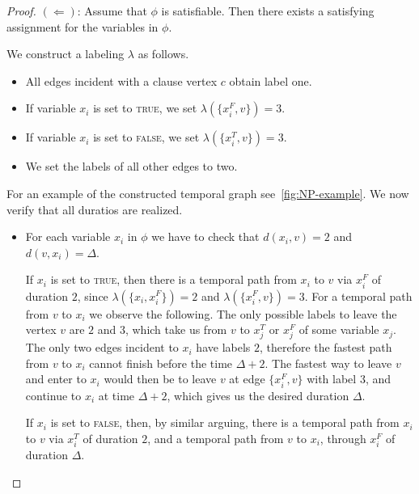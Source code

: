 \documentclass[a4paper,UKenglish,cleveref, autoref, thm-restate]{lipics-v2021}
\begin{document}
\begin{proof}

$(\Leftarrow)$: Assume that $\phi$ is satisfiable. Then there exists a satisfying assignment for the variables in $\phi$.

We construct a labeling $\lambda$ as follows.
\begin{itemize}
    \item All edges incident with a clause vertex $c$ obtain label one.
    \item If variable $x_i$ is set to \textsc{true}, we set $\lambda(\{x_i^F, v\})=3$.
    \item If variable $x_i$ is set to \textsc{false}, we set $\lambda(\{x_i^T, v\})=3$.
    \item We set the labels of all other edges to two.
\end{itemize}
For an example of the constructed temporal graph see~\cref{fig:NP-example}.
We now verify that all duratios are realized.
\begin{itemize}
    \item For each variable $x_i$ in $\phi$ we have to check that $d(x_i,v)=2$
    and $d(v,x_i)=\Delta$. 
    
    If $x_i$ is set to \textsc{true}, then there is a temporal path from $x_i$ to $v$ via 
    $x_i^F$ of duration $2$, since
    $\lambda(\{x_i, x_i^F\})=2$ and $\lambda(\{x_i^F, v\})=3$.
    For a temporal path from $v$ to $x_i$ we observe the following.
    The only possible labels to leave the vertex $v$ are $2$ and $3$, which take us from $v$ to $x_j^T$ or $x_j^F$ of some variable $x_j$.
    The only two edges incident to $x_i$ have labels $2$, therefore the fastest path from $v$ to $x_i$
    cannot finish before the time $\Delta + 2$.
    The fastest way to leave $v$ and enter to $x_i$ would then be to leave $v$ at edge $\{x_i^F,v\}$ with label $3$,
    and continue to $x_i$ at time $\Delta + 2$,
    which gives us the desired duration $\Delta$.
    
    If $x_i$ is set to \textsc{false}, then, by similar arguing, 
    there is a temporal path from $x_i$ to $v$ via $x_i^T$ of duration $2$,
    and a temporal path from $v$ to $x_i$, through $x_i^F$ of duration $\Delta$.


\end{itemize}
\end{proof}
\end{document}
